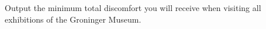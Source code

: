 
    Output the minimum total discomfort you will receive
    when visiting all exhibitions of the Groninger Museum.
